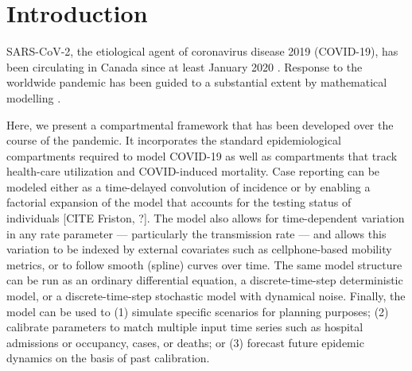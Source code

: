 \documentclass[12pt]{article}\usepackage[]{graphicx}\usepackage[]{color}
\begin{document}

\tableofcontents




\section{Introduction}

SARS-CoV-2, the
etiological agent of coronavirus disease 2019 (COVID-19), has been
circulating in Canada since at least January 2020 \cite{onpr_200125}.
Response to the worldwide pandemic \cite{Li+20,Fauc+20} has been
guided to a substantial extent by mathematical modelling
\cite{Flax+20}.


Here, we present a compartmental framework that has been developed
over the course of the pandemic. It incorporates the standard epidemiological compartments
required to model COVID-19 as well as compartments that track health-care utilization and COVID-induced
mortality. Case reporting can be modeled either as a time-delayed convolution
of incidence or by enabling a factorial expansion of the model that accounts
for the testing status of individuals [CITE Friston, ?]. The model also allows
for time-dependent variation in any rate parameter --- particularly the transmission rate --- and
allows this variation to be indexed by external covariates such as cellphone-based mobility
metrics, or to follow smooth (spline) curves over time. The same model structure can be
run as an ordinary differential equation,
a discrete-time-step deterministic model, or
a discrete-time-step stochastic model with dynamical noise.
Finally, the model can be used to
(1) simulate specific scenarios for planning purposes; 
(2) calibrate parameters to match multiple input time series such as hospital admissions or occupancy, cases, or deaths; or
(3) forecast future epidemic dynamics on the basis of past calibration.
\end{document}
